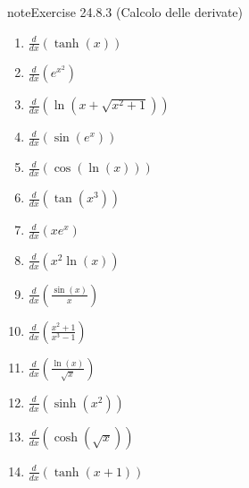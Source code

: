 \documentclass[letterpaper,10pt,italian]{jupyterBook}
\begin{document}
\begin{sphinxadmonition}{note}{Exercise 24.8.3 (Calcolo delle derivate)}
\begin{enumerate}
\item {} 
\sphinxAtStartPar
\(\frac{d}{dx} \left(\tanh(x)\right)\)

\item {} 
\sphinxAtStartPar
\(\frac{d}{dx} \left(e^{x^2}\right)\)

\item {} 
\sphinxAtStartPar
\(\frac{d}{dx} \left(\ln(x + \sqrt{x^2 + 1})\right)\)

\item {} 
\sphinxAtStartPar
\(\frac{d}{dx} \left(\sin(e^x)\right)\)

\item {} 
\sphinxAtStartPar
\(\frac{d}{dx} \left(\cos(\ln(x))\right)\)

\item {} 
\sphinxAtStartPar
\(\frac{d}{dx} \left(\tan(x^3)\right)\)

\item {} 
\sphinxAtStartPar
\(\frac{d}{dx} \left(x e^x\right)\)

\item {} 
\sphinxAtStartPar
\(\frac{d}{dx} \left(x^2 \ln(x)\right)\)

\item {} 
\sphinxAtStartPar
\(\frac{d}{dx} \left(\frac{\sin(x)}{x}\right)\)

\item {} 
\sphinxAtStartPar
\(\frac{d}{dx} \left(\frac{x^2 + 1}{x^3 - 1}\right)\)

\item {} 
\sphinxAtStartPar
\(\frac{d}{dx} \left(\frac{\ln(x)}{\sqrt{x}}\right)\)

\item {} 
\sphinxAtStartPar
\(\frac{d}{dx} \left(\sinh(x^2)\right)\)

\item {} 
\sphinxAtStartPar
\(\frac{d}{dx} \left(\cosh(\sqrt{x})\right)\)

\item {} 
\sphinxAtStartPar
\(\frac{d}{dx} \left(\tanh(x + 1)\right)\)

\end{enumerate}
\end{sphinxadmonition}
 \label{exercise:ch/infinitesimal_calculus/derivatives-problems-exercise-3}
\end{document}
